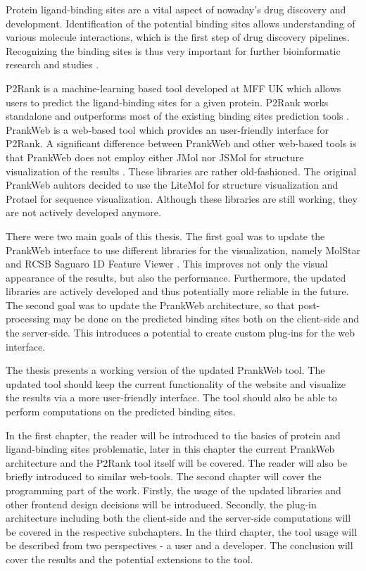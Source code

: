

Protein ligand-binding sites are a vital aspect of nowaday's drug discovery and development. Identification of the potential binding sites allows understanding of various molecule interactions, which is the first step of drug discovery pipelines. Recognizing the binding sites is thus very important for further bioinformatic research and studies \cite{10.1093/bioinformatics/btt447}.

P2Rank is a machine-learning based tool developed at MFF UK which allows users to predict the ligand-binding sites for a given protein. P2Rank works standalone and outperforms most of the existing binding sites prediction tools \cite{krivak2018p2rank}. PrankWeb is a web-based tool which provides an user-friendly interface for P2Rank. A significant difference between PrankWeb and other web-based tools is that PrankWeb does not employ either JMol nor JSMol for structure visualization of the results \cite{jendele2019prankweb}. These libraries are rather old-fashioned. The original PrankWeb auhtors decided to use the LiteMol for structure visualization and Protael for sequence visualization. Although these libraries are still working, they are not actively developed anymore.

There were two main goals of this thesis. The first goal was to update the PrankWeb interface to use different libraries for the visualization, namely MolStar \cite{10.1093/nar/gkab314} and RCSB Saguaro 1D Feature Viewer \cite{10.1093/bioinformatics/btaa1012}. This improves not only the visual appearance of the results, but also the performance. Furthermore, the updated libraries are actively developed and thus potentially more reliable in the future. The second goal was to update the PrankWeb architecture, so that post-processing may be done on the predicted binding sites both on the client-side and the server-side. This introduces a potential to create custom plug-ins for the web interface.

The thesis presents a working version of the updated PrankWeb tool. The updated tool should keep the current functionality of the website and visualize the results via a more user-friendly interface. The tool should also be able to perform computations on the predicted binding sites.

In the first chapter, the reader will be introduced to the basics of protein and ligand-binding sites problematic, later in this chapter the current PrankWeb architecture and the P2Rank tool itself will be covered. The reader will also be briefly introduced to similar web-tools. The second chapter will cover the programming part of the work. Firstly, the usage of the updated libraries and other frontend design decisions will be introduced. Secondly, the plug-in architecture including both the client-side and the server-side computations will be covered in the respective subchapters. In the third chapter, the tool usage will be described from two perspectives - a user and a developer. The conclusion will cover the results and the potential extensions to the tool.
